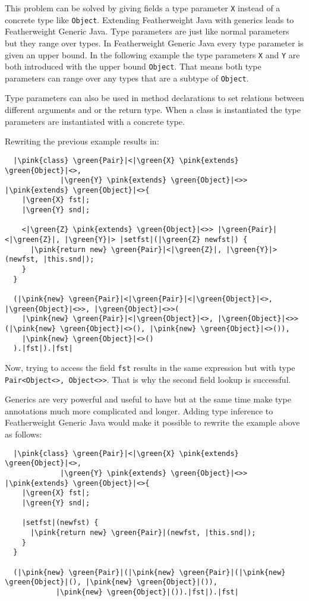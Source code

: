 This problem can be solved by giving fields a type parameter \verb|X| instead of a concrete type like \verb|Object|.
Extending Featherweight Java with generics leads to Featherweight Generic Java.
Type parameters are just like normal parameters but they range over types. In Featherweight Generic Java every type parameter is given an upper bound.
In the following example the type parameters \verb|X| and \verb|Y| are both introduced with the upper bound \verb|Object|.
That means both type parameters can range over any types that are a subtype of \verb|Object|.

Type parameters can also be used in method declarations to set relations between different arguments and or the return type.
When a class is instantiated the type parameters are instantiated with a concrete type.

Rewriting the previous example results in:

\begin{verbatim}
  |\pink{class} \green{Pair}|<|\green{X} \pink{extends} \green{Object}|<>,
             |\green{Y} \pink{extends} \green{Object}|<>> |\pink{extends} \green{Object}|<>{
    |\green{X} fst|;
    |\green{Y} snd|;

    <|\green{Z} \pink{extends} \green{Object}|<>> |\green{Pair}|<|\green{Z}|, |\green{Y}|> |setfst|(|\green{Z} newfst|) {
      |\pink{return new} \green{Pair}|<|\green{Z}|, |\green{Y}|>(newfst, |this.snd|);
    }
  }

  (|\pink{new} \green{Pair}|<|\green{Pair}|<|\green{Object}|<>, |\green{Object}|<>>, |\green{Object}|<>>(
    |\pink{new} \green{Pair}|<|\green{Object}|<>, |\green{Object}|<>>(|\pink{new} \green{Object}|<>(), |\pink{new} \green{Object}|<>()),
    |\pink{new} \green{Object}|<>()
  ).|fst|).|fst|
\end{verbatim}

Now, trying to access the field \verb|fst| results in the same expression but with type \verb|Pair<Object<>, Object<>>|. That is why the second field lookup is successful.

Generics are very powerful and useful to have but at the same time make type annotations much more complicated and longer.
Adding type inference to Featherweight Generic Java would make it possible to rewrite the example above as follows:

\begin{verbatim}
  |\pink{class} \green{Pair}|<|\green{X} \pink{extends} \green{Object}|<>,
             |\green{Y} \pink{extends} \green{Object}|<>> |\pink{extends} \green{Object}|<>{
    |\green{X} fst|;
    |\green{Y} snd|;

    |setfst|(newfst) {
      |\pink{return new} \green{Pair}|(newfst, |this.snd|);
    }
  }

  (|\pink{new} \green{Pair}|(|\pink{new} \green{Pair}|(|\pink{new} \green{Object}|(), |\pink{new} \green{Object}|()),
            |\pink{new} \green{Object}|()).|fst|).|fst|
\end{verbatim}

